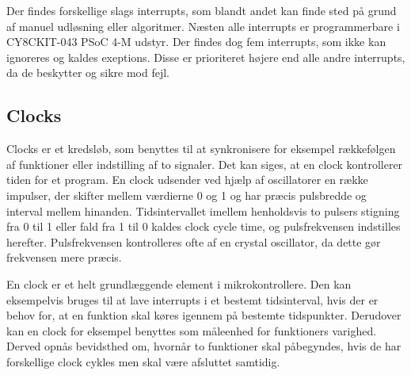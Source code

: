 Der findes forskellige slags interrupts, som blandt andet kan finde sted på grund af manuel udløsning eller algoritmer. Næsten alle interrupts er programmerbare i CY8CKIT-043 PSoC 4-M udstyr. Der findes dog fem interrupts, som ikke kan ignoreres og kaldes exeptions. Disse er prioriteret højere end alle andre interrupts, da de beskytter og sikre mod fejl. \citep{Badiger2016}

\subsection{Clocks}
Clocks er et kredsløb, som benyttes til at synkronisere for eksempel rækkefølgen af funktioner eller indstilling af to signaler. Det kan siges, at en clock kontrollerer tiden for et program. En clock udsender ved hjælp af oscillatorer en række impulser, der skifter mellem værdierne 0 og 1 og har præcis pulsbredde og interval mellem hinanden. Tidsintervallet imellem henholdsvis to pulsers stigning fra 0 til 1 eller fald fra 1 til 0 %
kaldes clock cycle time, og pulsfrekvensen indstilles herefter. Pulsfrekvensen kontrolleres ofte af en crystal oscillator, da dette gør frekvensen mere præcis. \citep{Tanenbaum2006}

En clock er et helt grundlæggende element i mikrokontrollere. Den kan eksempelvis bruges til at lave interrupts i et bestemt tidsinterval, hvis der er behov for, at en funktion skal køres igennem på bestemte tidspunkter. Derudover kan en clock for eksempel benyttes som måleenhed for funktioners varighed. Derved opnås bevidsthed om, hvornår to funktioner skal påbegyndes, hvis de har forskellige clock cykles men skal være afsluttet samtidig. \citep{Tanenbaum2006}


